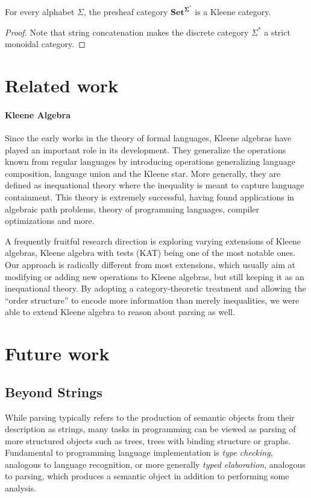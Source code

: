 \documentclass[acmsmall,anonymous,review,screen]{acmart}
\newcommand{\cat}[1]{\mathbf{#1}}
\begin{document}
\begin{corollary}
  For every alphabet $\Sigma$, the presheaf category $\cat{Set}^{\cat{\Sigma^*}}$
  is a Kleene category.
\end{corollary}
\begin{proof}
  Note that string concatenation makes the discrete category
  $\Sigma^*$ a strict monoidal category.
\end{proof}

\section{Related work}

\paragraph{Kleene Algebra}

Since the early works in the theory of formal languages, Kleene
algebras have played an important role in its development. They
generalize the operations known from regular languages by introducing
operations generalizing language composition, language union and the
Kleene star.  More generally, they are defined as inequational theory
where the inequality is meant to capture language containment. This
theory is extremely successful, having found applications in algebraic
path problems, theory of programming languages, compiler optimizations
and more.

A frequently fruitful research direction is exploring varying
extensions of Kleene algebras, Kleene algebra with tests (KAT) being
one of the most notable ones. Our approach is radically different from
most extensions, which usually aim at modifying or adding new
operations to Kleene algebras, but still keeping it as an inequational
theory. By adopting a category-theoretic treatment and allowing the
``order structure'' to encode more information than merely
inequalities, we were able to extend Kleene algebra to reason about
parsing as well.

\section{Future work}

\subsection{Beyond Strings}

While parsing typically refers to the production of semantic objects
from their description as strings, many tasks in programming can be
viewed as parsing of more structured objects such as trees, trees with
binding structure or graphs. Fundamental to programming language
implementation is \emph{type checking}, analogous to language
recognition, or more generally \emph{typed elaboration}, analogous to
parsing, which produces a semantic object in addition to performing
some analysis.
\end{document}
